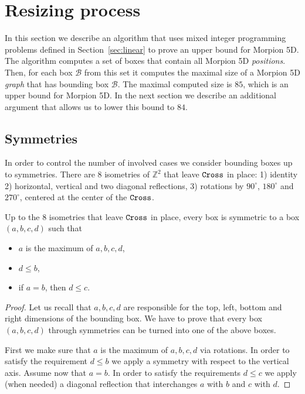 
\section{Resizing process}
\label{sec:gemmating}

In this section we describe an algorithm that uses mixed integer programming problems defined
  in Section~\ref{sec:linear} to prove an upper bound for Morpion 5D.
The algorithm computes a set of boxes that contain all Morpion 5D \emph{positions}. 
Then, for each box $\mathcal{B}$ from this set it computes the maximal size of a Morpion 5D \emph{graph}
   that has bounding box $\mathcal{B}$.
The maximal computed size is $85$, which is an upper bound for Morpion 5D.
In the next section we describe an additional argument that allows us to lower
  this bound to $84$.

\subsection{Symmetries}
\label{subsec:symmetries}

In order to control the number of involved cases we consider bounding boxes up to symmetries.
There are $8$ isometries of $\mathbb{Z}^2$ that leave $\texttt{Cross}$ in place: 
1) identity
2) horizontal, vertical and two diagonal reflections,
3) rotations by $90^\circ$, $180^\circ$ and $270^\circ$, centered at the center of the $\texttt{Cross}$.
  
\begin{lemma}
Up to the $8$ isometries that leave $\texttt{Cross}$ in place, every box is symmetric to a box $(a,b,c,d)$ such that
\begin{itemize}
\item $a$ is the maximum of $a,b,c,d$,
\item $d\leq b$,
\item if $a=b$, then $d\leq c$. 
\end{itemize}
\end{lemma}

\begin{proof}
Let us recall that $a,b,c,d$ are responsible for the top, left, bottom and right dimensions of the bounding box. 
We have to prove that every box $(a,b,c,d)$ through symmetries can be turned into one of the above boxes. 

First we make sure that $a$ is the maximum 
of $a,b,c,d$ via rotations. In order to satisfy the requirement $d\leq b$ we apply a symmetry with respect to the vertical axis. 
Assume now that $a=b$. In order to satisfy the requirements $d\leq c$ we apply (when needed) a diagonal reflection that interchanges $a$ with $b$ and $c$ with $d$.
\end{proof}

